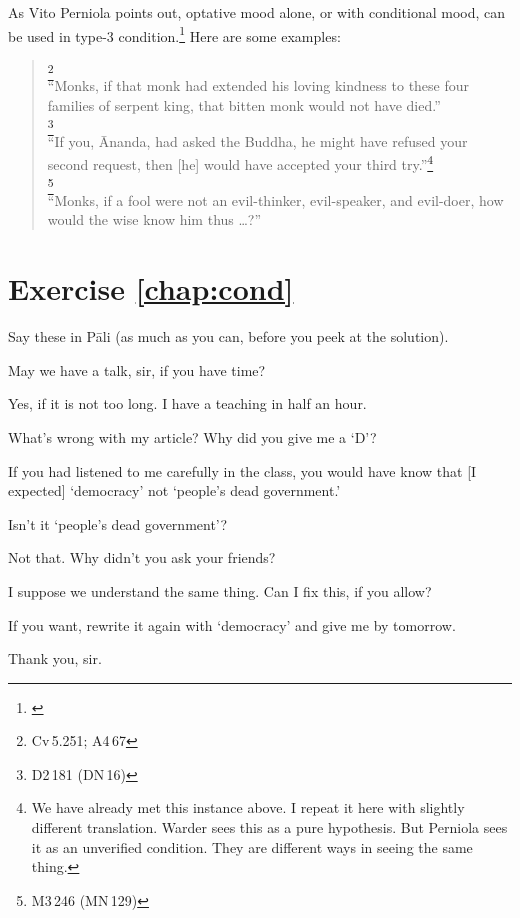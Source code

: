 As Vito Perniola points out, optative mood alone, or with conditional mood, can be used in type-3 condition.\footnote{\citealp[p.398]{perniola:grammar}} Here are some examples:

\begin{quote}
\footnote{Cv\,5.251; A4\,67}\\
``Monks, if that monk had extended his loving kindness to these four families of serpent king, that bitten monk would not have died.''\\[1.5mm]
\footnote{D2\,181 (DN\,16)}\\
``If you, \=Ananda, had asked the Buddha, he might have refused your second request, then [he] would have accepted your third try.''\footnote{We have already met this instance above. I repeat it here with slightly different translation. Warder sees this as a pure hypothesis. But Perniola sees it as an unverified condition. They are different ways in seeing the same thing.}\\[1.5mm]
\footnote{M3\,246 (MN\,129)}\\
``Monks, if a fool were not an evil-thinker, evil-speaker, and evil-doer, how would the wise know him thus \ldots?''\\[1.5mm]
\end{quote}

\section*{Exercise \ref{chap:cond}}
Say these in P\=ali (as much as you can, before you peek at the solution).
\begin{compactenum}
\item May we have a talk, sir, if you have time?
\item Yes, if it is not too long. I have a teaching in half an hour.
\item What's wrong with my article? Why did you give me a `D'?
\item If you had listened to me carefully in the class, you would have know that [I expected] `democracy' not `people's dead government.'
\item Isn't it `people's dead government'?
\item Not that. Why didn't you ask your friends?
\item I suppose we understand the same thing. Can I fix this, if you allow?
\item If you want, rewrite it again with `democracy' and give me by tomorrow.
\item Thank you, sir.
\end{compactenum}
